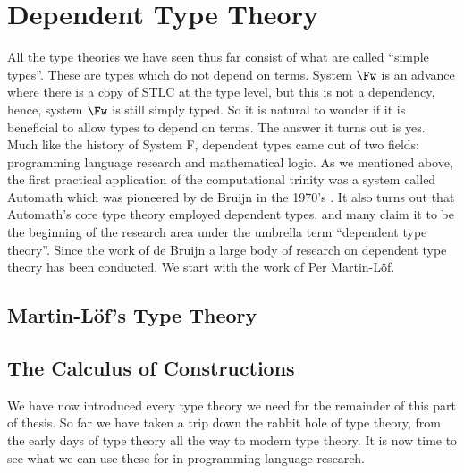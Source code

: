 \chapter{Dependent Type Theory}
\label{chap:dependent_type_theory}
All the type theories we have seen thus far consist of what are called
``simple types''.  These are types which do not depend on terms.
System $\Fw$ is an advance where there is a copy of STLC at the type
level, but this is not a dependency, hence, system $\Fw$ is still
simply typed.  So it is natural to wonder if it is beneficial to allow
types to depend on terms.  The answer it turns out is yes. Much like
the history of System F, dependent types came out of two fields:
programming language research and mathematical logic.  As we mentioned
above, the first practical application of the computational trinity
was a system called Automath which was pioneered by de Bruijn in the
1970's \cite{DeBruijn:1970}.  It also turns out that Automath's core
type theory employed dependent types, and many claim it to be the
beginning of the research area under the umbrella term ``dependent
type theory''.  Since the work of de Bruijn a large body of research
on dependent type theory has been conducted.  We start with the work
of Per Martin-L\"of.

\section{Martin-L\"of's Type Theory}
\label{sec:martin-lofs_type_theory}


\section{The Calculus of Constructions}
\label{sec:the_calculus_of_constructions}




We have now introduced every type theory we need for the remainder of
this part of thesis.  So far we have taken a trip down the rabbit hole
of type theory, from the early days of type theory all the way to
modern type theory.  It is now time to see what we can use these for
in programming language research.

